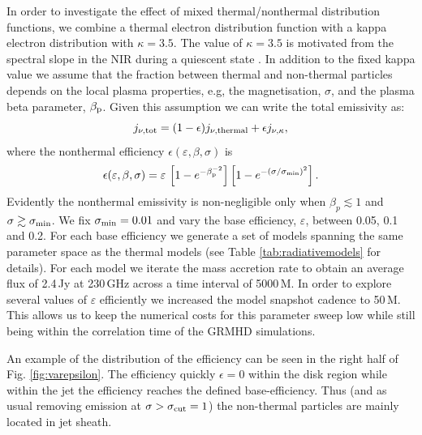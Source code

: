In order to investigate the effect of mixed thermal/nonthermal distribution functions, we combine a thermal electron distribution function with a kappa electron distribution with $\kappa=3.5$. The value of $\kappa=3.5$ is motivated from the spectral slope in the NIR during a quiescent state .  In addition to the fixed kappa value we assume that the fraction between thermal and non-thermal particles depends on the local plasma properties, e.g, the magnetisation, $\sigma$, and the plasma beta parameter, $\beta_{\rm p}$. Given this assumption we can write the total emissivity as:
\begin{equation}
j_{\nu,\rm{tot}}=(1-\epsilon) j_{\nu,\rm{thermal}} + \epsilon j_{\nu, \kappa},
\label{eq:kappaeff}
\end{equation}
where the nonthermal efficiency $\epsilon( \varepsilon, \beta, \sigma)$ is 
\begin{equation}
    \epsilon(\varepsilon,\beta,\sigma)=\varepsilon\,
    \left[1 - e^{-\beta_{\rm p}^{-2}}\right]
    \left[1-e^{-(\sigma/\sigma_{\rm min})^2}\right].
    \label{eq:efficiencybetasigma}
\end{equation}
Evidently the nonthermal emissivity is non-negligible only when $\beta_p \lesssim 1$ and $\sigma \gtrsim \sigma_{\rm min}$.  We fix $\sigma_{\rm min}=0.01$ and vary the base efficiency, $\varepsilon$, between 0.05, 0.1 and 0.2. For each base efficiency we generate a set of models spanning the same parameter space as the thermal models (see Table \ref{tab:radiativemodels} for details). For each model we iterate the mass accretion rate to obtain an average flux of 2.4\,Jy at 230\,GHz across a time interval of 5000\,M. In order to explore several values of $\varepsilon$ efficiently we increased the model snapshot cadence to 50\,M. This allows us to keep the numerical costs for this parameter sweep low while still being within the correlation time of the GRMHD simulations. 

An example of the distribution of the efficiency can be seen in the right half of  Fig. \ref{fig:varepsilon}. The efficiency quickly $\epsilon=0$ within the disk region while within the jet the efficiency reaches the defined base-efficiency. Thus (and as usual removing emission at $\sigma > \sigma_{\rm cut}=1$) the non-thermal particles are mainly located in jet sheath.

